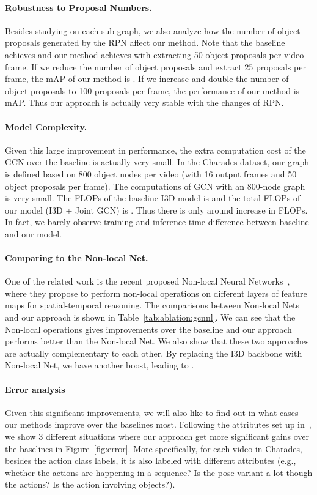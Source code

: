 \documentclass[runningheads]{llncs}
\begin{document}
\paragraph{Robustness to Proposal Numbers.} Besides studying on each sub-graph, we also analyze how the number of object proposals generated by the RPN affect our method. Note that the baseline achieves  and our method achieves  with extracting 50 object proposals per video frame. If we reduce the number of object proposals and extract 25 proposals per frame, the mAP of our method is . If we increase and double the number of object proposals to 100 proposals per frame, the performance of our method is  mAP. Thus our approach is actually very stable with the changes of RPN. 



\paragraph{Model Complexity.} Given this large improvement in performance, the extra computation cost of the GCN over the baseline is actually very small. In the Charades dataset, our graph is defined based on 800 object nodes per video (with 16 output frames and 50 object proposals per frame). The computations of GCN with an 800-node graph is very small.  The FLOPs of the baseline I3D model is  and the total FLOPs of our model (I3D + Joint GCN) is . Thus there is only around  increase in FLOPs. In fact, we barely observe training and inference time difference between baseline and our model. 



\paragraph{Comparing to the Non-local Net.} One of the related work is the recent proposed Non-local Neural Networks~\cite{xiaolongwang2017nonlocal}, where they propose to perform non-local operations on different layers of feature maps for spatial-temporal reasoning. The comparisons between Non-local Nets and our approach is shown in Table~\ref{tab:ablation:gcnnl}. We can see that the Non-local operations gives  improvements over the baseline and   our approach performs  better than the Non-local Net. We also show that these two approaches are actually complementary to each other. By replacing the I3D backbone with Non-local Net, we have another  boost, leading to .  

\paragraph{Error analysis}  
Given this significant improvements, we will also like to find out in what cases our methods improve over the baselines most. Following the attributes set up in~\cite{sigurdsson2017actions}, we show 3 different situations where our approach get more significant gains over the baselines in Figure~\ref{fig:error}. More specifically, for each video in Charades, besides the action class labels, it is also labeled with different attributes (e.g., whether the actions are happening in a sequence? Is the pose variant a lot though the actions? Is the action involving objects?). 
\end{document}
